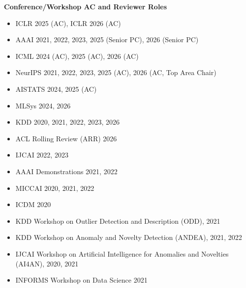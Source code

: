 \documentclass[margin,line,pifont,palatino,courier]{res}
\begin{document}
\begin{resume}
\textbf{Conference/Workshop AC and Reviewer Roles}
\begin{itemize}[leftmargin=*]
\setlength\itemsep{-0.1em}
    \item ICLR 2025 (AC), ICLR 2026 (AC)
    \item AAAI 2021, 2022, 2023, 2025 (Senior PC), 2026 (Senior PC)
    \item ICML 2024 (AC), 2025 (AC), 2026 (AC)
    \item NeurIPS 2021, 2022, 2023, 2025 (AC), 2026 (AC, Top Area Chair)
    \item AISTATS 2024, 2025 (AC)
    \item MLSys 2024, 2026
    \item KDD 2020, 2021, 2022, 2023, 2026
    \item ACL Rolling Review (ARR) 2026
    \item IJCAI 2022, 2023
    \item AAAI Demonstrations 2021, 2022
    \item MICCAI 2020, 2021, 2022
    \item ICDM 2020
    \item KDD Workshop on Outlier Detection and Description (ODD), 2021
    \item KDD Workshop on Anomaly and Novelty Detection (ANDEA), 2021, 2022
    \item IJCAI Workshop on Artificial Intelligence for Anomalies and Novelties (AI4AN), 2020, 2021
    \item INFORMS Workshop on Data Science 2021
\end{itemize}



\end{resume}
\end{document}
